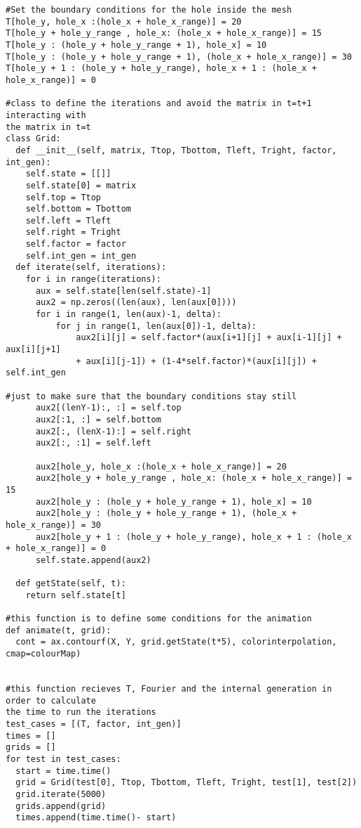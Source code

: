 \documentclass[article]{abntex2}
\begin{document}
\begin{lstlisting}
#Set the boundary conditions for the hole inside the mesh
T[hole_y, hole_x :(hole_x + hole_x_range)] = 20 
T[hole_y + hole_y_range , hole_x: (hole_x + hole_x_range)] = 15 
T[hole_y : (hole_y + hole_y_range + 1), hole_x] = 10 
T[hole_y : (hole_y + hole_y_range + 1), (hole_x + hole_x_range)] = 30 
T[hole_y + 1 : (hole_y + hole_y_range), hole_x + 1 : (hole_x + hole_x_range)] = 0

#class to define the iterations and avoid the matrix in t=t+1 interacting with 
the matrix in t=t
class Grid:
  def __init__(self, matrix, Ttop, Tbottom, Tleft, Tright, factor, int_gen):
    self.state = [[]]
    self.state[0] = matrix
    self.top = Ttop
    self.bottom = Tbottom
    self.left = Tleft
    self.right = Tright
    self.factor = factor
    self.int_gen = int_gen
  def iterate(self, iterations):
    for i in range(iterations):
      aux = self.state[len(self.state)-1]
      aux2 = np.zeros((len(aux), len(aux[0])))
      for i in range(1, len(aux)-1, delta):
          for j in range(1, len(aux[0])-1, delta):
              aux2[i][j] = self.factor*(aux[i+1][j] + aux[i-1][j] + aux[i][j+1]
              + aux[i][j-1]) + (1-4*self.factor)*(aux[i][j]) + self.int_gen

#just to make sure that the boundary conditions stay still
      aux2[(lenY-1):, :] = self.top
      aux2[:1, :] = self.bottom
      aux2[:, (lenX-1):] = self.right
      aux2[:, :1] = self.left

      aux2[hole_y, hole_x :(hole_x + hole_x_range)] = 20 
      aux2[hole_y + hole_y_range , hole_x: (hole_x + hole_x_range)] = 15 
      aux2[hole_y : (hole_y + hole_y_range + 1), hole_x] = 10 
      aux2[hole_y : (hole_y + hole_y_range + 1), (hole_x + hole_x_range)] = 30 
      aux2[hole_y + 1 : (hole_y + hole_y_range), hole_x + 1 : (hole_x + hole_x_range)] = 0 
      self.state.append(aux2)

  def getState(self, t):
    return self.state[t]

#this function is to define some conditions for the animation
def animate(t, grid):
  cont = ax.contourf(X, Y, grid.getState(t*5), colorinterpolation, cmap=colourMap)


#this function recieves T, Fourier and the internal generation in order to calculate
the time to run the iterations
test_cases = [(T, factor, int_gen)]
times = []
grids = []
for test in test_cases:
  start = time.time()
  grid = Grid(test[0], Ttop, Tbottom, Tleft, Tright, test[1], test[2])
  grid.iterate(5000)
  grids.append(grid)
  times.append(time.time()- start)


\end{lstlisting}
\end{document}
